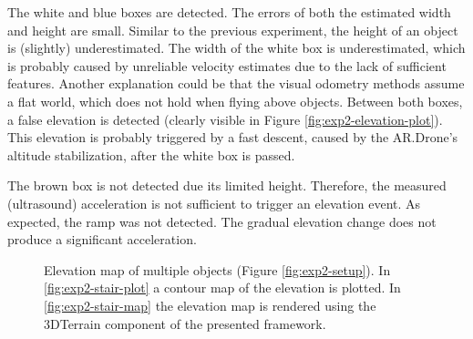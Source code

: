 The white and blue boxes are detected.
The errors of both the estimated width and height are small.
Similar to the previous experiment, the height of an object is (slightly) underestimated.
The width of the white box is underestimated, which is probably caused by unreliable velocity estimates due to the lack of sufficient features.
Another explanation could be that the visual odometry methods assume a flat world, which does not hold when flying above objects.
Between both boxes, a false elevation is detected (clearly visible in Figure \ref{fig:exp2-elevation-plot}).
This elevation is probably triggered by a fast descent, caused by the AR.Drone's altitude stabilization, after the white box is passed.

The brown box is not detected due its limited height.
Therefore, the measured (ultrasound) acceleration is not sufficient to trigger an elevation event.
As expected, the ramp was not detected.
The gradual elevation change does not produce a significant acceleration.

\begin{figure}[htb!]
  \begin{center}

 \end{center}
  \caption{Elevation map of multiple objects (Figure \ref{fig:exp2-setup}). In \ref{fig:exp2-stair-plot} a contour map of the elevation is plotted. In \ref{fig:exp2-stair-map} the elevation map is rendered using the 3DTerrain component of the presented framework.}
  \label{fig:exp2-2-results}
\end{figure}